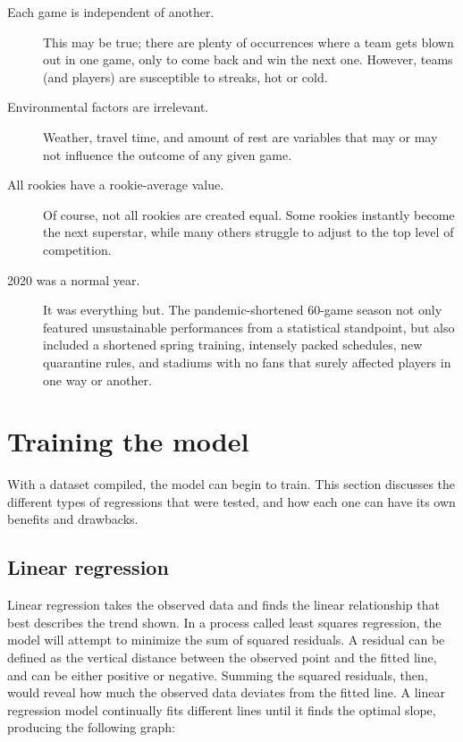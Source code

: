 \documentclass{paper}
\begin{document}
\begin{description}
\item[Each game is independent of another.] This may be true; there are plenty of occurrences where a team gets blown out in one game, only to come back and win the next one. However, teams (and players) are susceptible to streaks, hot or cold.
\item[Environmental factors are irrelevant.] Weather, travel time, and amount of rest are variables that may or may not influence the outcome of any given game.
\item[All rookies have a rookie-average value.] Of course, not all rookies are created equal. Some rookies instantly become the next superstar, while many others struggle to adjust to the top level of competition.
\item[2020 was a normal year.] It was everything but. The pandemic-shortened 60-game season not only featured unsustainable performances from a statistical standpoint, but also included a shortened spring training, intensely packed schedules, new quarantine rules, and stadiums with no fans that surely affected players in one way or another.
\end{description}

\section{Training the model}
With a dataset compiled, the model can begin to train. This section discusses the different types of regressions that were tested, and how each one can have its own benefits and drawbacks.

\subsection{Linear regression}
Linear regression takes the observed data and finds the linear relationship that best describes the trend shown. In a process called least squares regression, the model will attempt to minimize the sum of squared residuals. A residual can be defined as the vertical distance between the observed point and the fitted line, and can be either positive or negative. Summing the squared residuals, then, would reveal how much the observed data deviates from the fitted line. A linear regression model continually fits different lines until it finds the optimal slope, producing the following graph:
\end{document}
